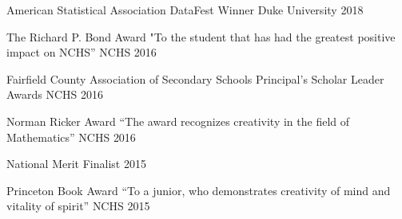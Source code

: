 



\begin{cvhonors}


\cvhonor
{American Statistical Association DataFest Winner}
{}
{Duke University}
{2018}

\cvhonor
{The Richard P. Bond Award} %
{"To the student that has had the greatest positive impact on NCHS”} %
{NCHS} %
{2016} %


\cvhonor
{Fairfield County Association of Secondary Schools Principal’s Scholar Leader Awards} %
{} %
{NCHS} %
{2016} %


\cvhonor
{Norman Ricker Award} %
{“The award recognizes creativity in the field of Mathematics”} %
{NCHS} %
{2016} %


\cvhonor
{National Merit Finalist} %
{} %
{} %
{2015} %


\cvhonor
{Princeton Book Award} %
{“To a junior, who demonstrates creativity of mind and vitality of spirit”} %
{NCHS} %
{2015} %


\end{cvhonors}

